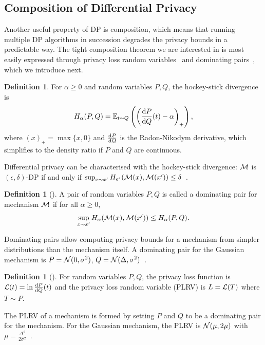 \documentclass{article}
\theoremstyle{plain}
\theoremstyle{definition}
\newtheorem{definition}[theorem]{Definition}
\theoremstyle{remark}
\begin{document}
\subsection{Composition of Differential Privacy}\label{sec:dp-composition}
Another useful property of DP is composition, which means that 
running multiple DP algorithms in succession degrades the privacy 
bounds in a predictable way. The tight composition theorem we are interested 
in is most easily expressed through privacy loss random 
variables~\citep{sommerPrivacyLossClasses2019} and 
dominating pairs~\citep{zhuOptimalAccountingDifferential2022}, 
which we introduce next.

\begin{definition}\label{def:hockey-stick-divergence}
    For $\alpha \geq 0$ and random variables $P, Q$, the hockey-stick divergence is 
    \begin{equation}
        H_\alpha(P, Q) = \operatorname{\mathbb{E}}_{t\sim Q}\left(\left(\frac{\mathrm{d} P}{\mathrm{d} Q}(t) - \alpha\right)_+\right),
    \end{equation}
    where $(x)_+ = \max\{x, 0\}$ and $\frac{\mathrm{d} P}{\mathrm{d} Q}$ is the Radon-Nikodym
    derivative, which simplifies to the density ratio if $P$ and $Q$ are 
    continuous.
\end{definition}
Differential privacy can be characterised with the hockey-stick divergence:
$\mathcal{M}$ is $(\epsilon, \delta)$-DP if and only if 
$\sup_{x\sim x'} H_{e^\epsilon}(\mathcal{M}(x), \mathcal{M}(x')) \leq \delta$~\citep{zhuOptimalAccountingDifferential2022}.

\begin{definition}[\citealt{zhuOptimalAccountingDifferential2022}]\label{def:dominating-pair}
    A pair of random variables $P, Q$ is called a dominating pair for mechanism 
    $\mathcal{M}$ if for all $\alpha \geq 0$,
    \begin{equation}
        \sup_{x\sim x'} H_\alpha(\mathcal{M}(x), \mathcal{M}(x')) \leq H_\alpha(P, Q).
    \end{equation}
\end{definition}
Dominating pairs allow computing privacy bounds for a mechanism from simpler 
distributions than the mechanism itself. A dominating pair for the 
Gaussian mechanism is $P = \mathcal{N}(0, \sigma^2)$, 
$Q = \mathcal{N}(\Delta, \sigma^2)$~\citep{KoskelaJH20}.

\begin{definition}[\citealt{sommerPrivacyLossClasses2019}]\label{def:plrv}
    For random variables $P, Q$, the privacy loss function is
    $\mathcal{L}(t) = \ln \frac{\mathrm{d} P}{\mathrm{d} Q}(t)$ and the 
    privacy loss random variable (PLRV) is $L = \mathcal{L}(T)$
    where $T\sim P$.
\end{definition}
The PLRV of a mechanism is formed by setting $P$ and $Q$ to be a 
dominating pair for the mechanism. For the Gaussian mechanism,
the PLRV is $\mathcal{N}(\mu, 2\mu)$ with 
$\mu = \frac{\Delta^2}{2\sigma^2}$~\citep{sommerPrivacyLossClasses2019}.
\end{document}
